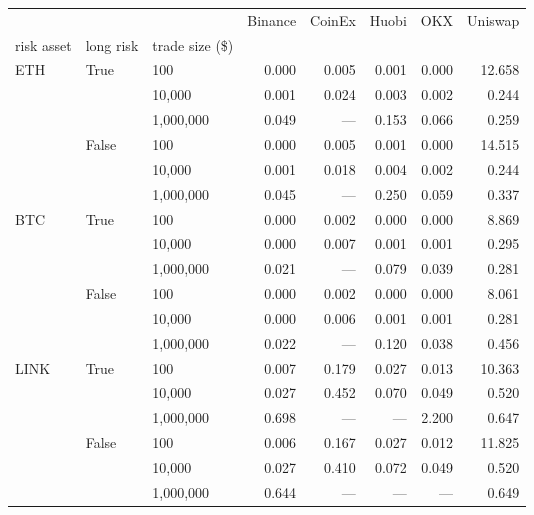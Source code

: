 \begin{tabular}{lllrrrrr}
\toprule
    &       &        &  Binance &  CoinEx &  Huobi &   OKX &  Uniswap \\
risk asset & long risk & trade size (\$) &          &         &        &       &          \\
\midrule
\multirow{6}{*}{ETH} & \multirow{3}{*}{True} & 100 &    0.000 &   0.005 &  0.001 & 0.000 &   12.658 \\
    &       & 10,000 &    0.001 &   0.024 &  0.003 & 0.002 &    0.244 \\
    &       & 1,000,000 &    0.049 &     --- &  0.153 & 0.066 &    0.259 \\
\cline{2-8}
    & \multirow{3}{*}{False} & 100 &    0.000 &   0.005 &  0.001 & 0.000 &   14.515 \\
    &       & 10,000 &    0.001 &   0.018 &  0.004 & 0.002 &    0.244 \\
    &       & 1,000,000 &    0.045 &     --- &  0.250 & 0.059 &    0.337 \\
\cline{1-8}
\cline{2-8}
\multirow{6}{*}{BTC} & \multirow{3}{*}{True} & 100 &    0.000 &   0.002 &  0.000 & 0.000 &    8.869 \\
    &       & 10,000 &    0.000 &   0.007 &  0.001 & 0.001 &    0.295 \\
    &       & 1,000,000 &    0.021 &     --- &  0.079 & 0.039 &    0.281 \\
\cline{2-8}
    & \multirow{3}{*}{False} & 100 &    0.000 &   0.002 &  0.000 & 0.000 &    8.061 \\
    &       & 10,000 &    0.000 &   0.006 &  0.001 & 0.001 &    0.281 \\
    &       & 1,000,000 &    0.022 &     --- &  0.120 & 0.038 &    0.456 \\
\cline{1-8}
\cline{2-8}
\multirow{6}{*}{LINK} & \multirow{3}{*}{True} & 100 &    0.007 &   0.179 &  0.027 & 0.013 &   10.363 \\
    &       & 10,000 &    0.027 &   0.452 &  0.070 & 0.049 &    0.520 \\
    &       & 1,000,000 &    0.698 &     --- &    --- & 2.200 &    0.647 \\
\cline{2-8}
    & \multirow{3}{*}{False} & 100 &    0.006 &   0.167 &  0.027 & 0.012 &   11.825 \\
    &       & 10,000 &    0.027 &   0.410 &  0.072 & 0.049 &    0.520 \\
    &       & 1,000,000 &    0.644 &     --- &    --- &   --- &    0.649 \\
\cline{1-8}

\end{tabular}
